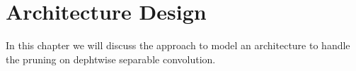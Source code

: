 \chapter{Architecture Design}
\label{chap:arch}
In this chapter we will discuss the approach to model an architecture to handle the pruning on dephtwise separable convolution.
